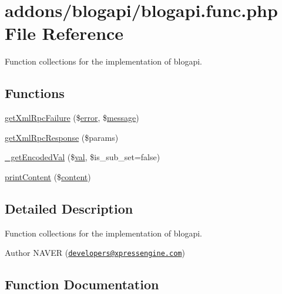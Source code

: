 \hypertarget{blogapi_8func_8php}{}\section{addons/blogapi/blogapi.func.\+php File Reference}
\label{blogapi_8func_8php}


Function collections for the implementation of blogapi.  


\subsection*{Functions}
\begin{DoxyCompactItemize}
\item 
\hyperlink{blogapi_8func_8php_a7e46f8d2f9b3c3115d176926b68b6b09}{get\+Xml\+Rpc\+Failure} (\$\hyperlink{common_2js_2jquery_8js_ad9c7b7332a24ed93fb21cd053c99bd12}{error}, \$\hyperlink{classmessage}{message})
\item 
\hyperlink{blogapi_8func_8php_a18b93e72ecaae5fdfcfe1f0f107238f6}{get\+Xml\+Rpc\+Response} (\$params)
\item 
\hyperlink{blogapi_8func_8php_a1557492ae9fc007747ea06aad32948a0}{\+\_\+get\+Encoded\+Val} (\$\hyperlink{ckeditor_2js_2xe__interface_8js_a4fb96abdf073a439bca5e051c333b35d}{val}, \$is\+\_\+sub\+\_\+set=false)
\item 
\hyperlink{blogapi_8func_8php_aee14687cb1bc033360baef8b634ab27e}{print\+Content} (\$\hyperlink{classcontent}{content})
\end{DoxyCompactItemize}


\subsection{Detailed Description}
Function collections for the implementation of blogapi. 

\begin{DoxyAuthor}{Author}
N\+A\+V\+ER (\href{mailto:developers@xpressengine.com}{\tt developers@xpressengine.\+com}) 
\end{DoxyAuthor}


\subsection{Function Documentation}
